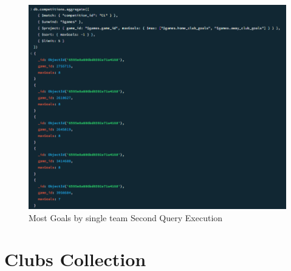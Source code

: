\documentclass{Configuration_Files/PoliMi3i_thesis}
\begin{document}
\begin{figure}[htbp]
    \centering
    \includegraphics[scale=0.9]{Images/Queries/Competitions/most_goal_single_teams/mgstcl.png}
    \caption{Most Goals by single team Second Query Execution}
\end{figure}
\newpage
\section{Clubs Collection}
\end{document}
